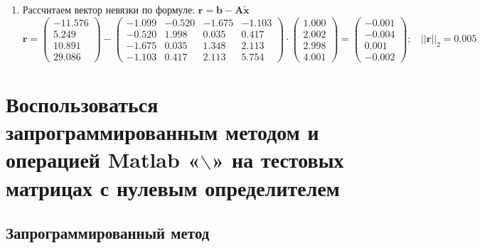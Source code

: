 \begin{enumerate}
    \item Рассчитаем вектор невязки по формуле: $\mathbf{r}=\mathbf{b}-\textbf{A}\widetilde{\mathbf{x}}$
    \[ \mathbf{r}=
    \begin{pmatrix}-11.576\\5.249\\10.891\\29.086\end{pmatrix} -
    \begin{pmatrix}
        -1.099& -0.520& -1.675& -1.103\\
        -0.520&  1.998&  0.035&  0.417\\
        -1.675&  0.035&  1.348&  2.113\\
        -1.103&  0.417&  2.113&  5.754
    \end{pmatrix} \cdot
    \begin{pmatrix} 1.000\\2.002\\2.998\\4.001\end{pmatrix} =
    \begin{pmatrix}  -0.001\\-0.004\\0.001\\-0.002 \end{pmatrix}; ~~~~ ||\mathbf{r}||_2 = \mathbf{0.005} \]
\end{enumerate}

\clearpage
\section{Воспользоваться запрограммированным методом и операцией Matlab «$\backslash$» на тестовых матрицах с нулевым определителем}
\subsection{Запрограммированный метод}
